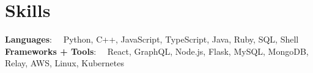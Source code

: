 \documentclass[letterpaper,11pt]{article}
\begin{document}

\section{Skills}
\vspace{-4pt}
\begin{itemize}[leftmargin=0in, label={}]
  \small{\item{
                \textbf{\hspace{13.77mm}  Languages}{: \ \ Python, C++, JavaScript, TypeScript, Java, Ruby, SQL, Shell} \\
                \textbf{Frameworks + Tools}{: \ \ React, GraphQL, Node.js, Flask, MySQL, MongoDB, Relay, AWS, Linux, Kubernetes}}}
\end{itemize}


\end{document}
